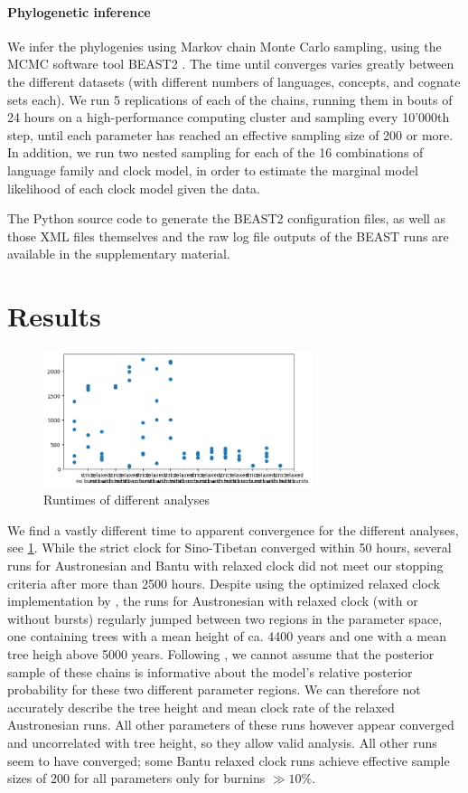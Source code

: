 \documentclass[a4paper,12pt]{scrartcl}
\begin{document}
\paragraph{Phylogenetic inference}
We infer the phylogenies using Markov chain Monte Carlo sampling, using the MCMC
software tool BEAST2 \parencite{drummond2015bayesian}. The time until converges varies greatly
between the different datasets (with different numbers of languages, concepts, and
cognate sets each).
We run 5 replications of each of the chains, running them in bouts of 24 hours on a high-performance
computing cluster and sampling every 10'000th step, until each parameter has reached an effective sampling size of 
200 or more.
In addition, we run two nested sampling for each of the 16 combinations of
language family and clock model, in order to estimate the marginal model likelihood
of each clock model given the data.

The Python source code to generate the BEAST2 configuration files, as well as
those XML files themselves and the raw log file outputs of the BEAST runs are
available in the supplementary material.

\section{Results}\label{s:results}
\begin{figure}
  \centering
  \includegraphics[width=0.7\textwidth]{supplement/analysis/runtimes.png}
  \caption{Runtimes of different analyses}\label{f:runtimes}
\end{figure}
We find a vastly different time to apparent convergence for the different
analyses, see \cref{f:runtimes}. While the strict clock for Sino-Tibetan converged within 50 hours,
several runs for Austronesian and Bantu with relaxed clock did not meet our
stopping criteria after more than 2500 hours. Despite using the optimized relaxed clock
implementation by \textcite{orc}, the runs for Austronesian with relaxed clock
(with or without bursts) regularly jumped between two regions in the parameter
space, one containing trees with a mean height of ca. 4400 years and one with a
mean tree heigh above 5000 years. Following \textcite{brown2018behavior}, we cannot
assume that the posterior sample of these chains is informative about the
model's relative posterior probability for these two different parameter regions.
We can therefore not accurately describe the tree height and mean clock rate of
the relaxed Austronesian runs. All other parameters of these runs however appear
converged and uncorrelated with tree height, so they allow valid analysis.
All other runs seem to have converged; some Bantu relaxed clock runs achieve
effective sample sizes of 200 for all parameters only for burnins $\gg 10\%$.
\end{document}

